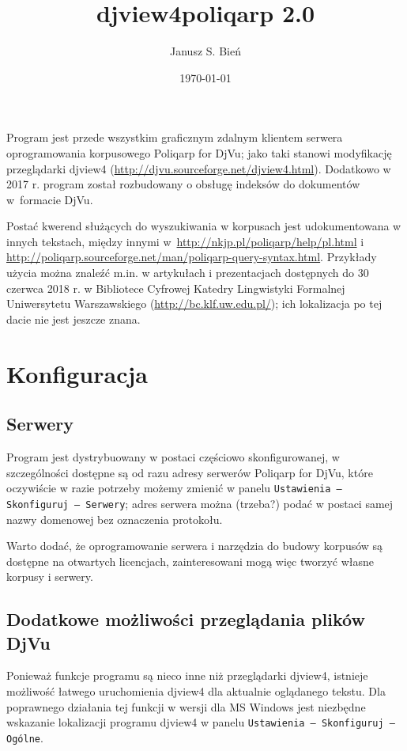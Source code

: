 \documentclass{mwart}
\title{djview4poliqarp 2.0}
\author{Janusz S. Bień}
\date{\today}
\begin{document}
\maketitle
\thispagestyle{empty}
\pagestyle{empty}

Program jest przede wszystkim graficznym zdalnym klientem serwera
oprogramowania korpusowego \textsf{Poliqarp for DjVu}; jako taki
stanowi modyfikację przeglądarki \textsf{djview4}
(\url{http://djvu.sourceforge.net/djview4.html}). Dodatkowo w 2017
r. program został rozbudowany o obsługę indeksów do dokumentów
w~formacie DjVu.

Postać kwerend służących do wyszukiwania w korpusach jest
udokumentowana w innych tekstach, między innymi
w~\url{http://nkjp.pl/poliqarp/help/pl.html} i
\url{http://poliqarp.sourceforge.net/man/poliqarp-query-syntax.html}.
Przykłady użycia można znaleźć m.in. w artykułach i prezentacjach
dostępnych do 30 czerwca 2018 r. w Bibliotece Cyfrowej Katedry
Lingwistyki Formalnej Uniwersytetu Warszawskiego
(\url{http://bc.klf.uw.edu.pl/}); ich lokalizacja po tej dacie nie
jest jeszcze znana.

\section{Konfiguracja}
\label{sec:konfiguracja}

\subsection{Serwery}
\label{sec:serwery}

Program jest dystrybuowany w postaci częściowo skonfigurowanej, w
szczególności dostępne są od razu adresy serwerów \textsf{Poliqarp for
  DjVu}, które oczywiście w razie potrzeby możemy zmienić w panelu
\texttt{Ustawienia --- Skonfiguruj --- Serwery}; adres serwera można
(trzeba?)  podać w postaci samej nazwy domenowej bez oznaczenia
protokołu.

Warto dodać, że oprogramowanie serwera i narzędzia do budowy korpusów
są dostępne na otwartych licencjach, zainteresowani mogą więc tworzyć
własne korpusy i serwery.

\subsection{Dodatkowe możliwości przeglądania plików DjVu}
\label{sec:dodatk-moliw-przegld}

Ponieważ funkcje programu są nieco inne niż przeglądarki
\textsf{djview4}, istnieje możliwość łatwego uruchomienia
\textsf{djview4} dla aktualnie oglądanego tekstu. Dla poprawnego
działania tej funkcji w wersji dla MS Windows jest niezbędne wskazanie
lokalizacji programu \textsf{djview4} w panelu \texttt{Ustawienia ---
  Skonfiguruj --- Ogólne}.
\end{document}
